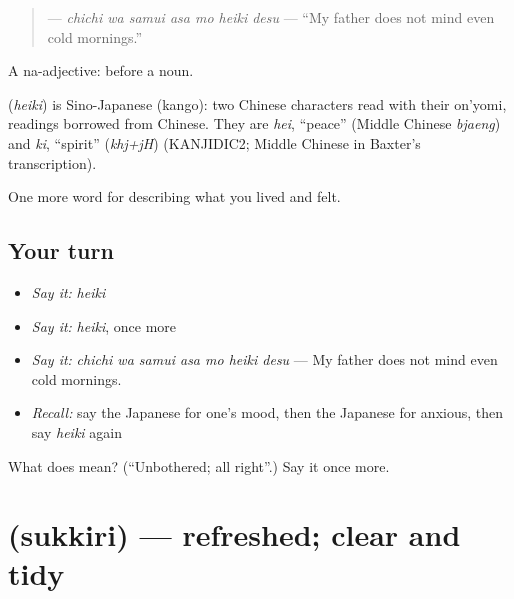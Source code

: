 \begin{quote}
\textbf{   } — \emph{chichi wa samui asa mo heiki desu} — \textquotedblleft{}My father does not mind even cold mornings.\textquotedblright{}
\end{quote}

A na-adjective:  before a noun.

\begin{cousinweb}
\textbf{} (\emph{heiki}) is Sino-Japanese (kango): two Chinese characters read with their on'yomi, readings borrowed from Chinese. They are \emph{hei}, \textquotedblleft{}peace\textquotedblright{} (Middle Chinese \emph{bjaeng}) and \emph{ki}, \textquotedblleft{}spirit\textquotedblright{} (\emph{khj+jH}) (KANJIDIC2; Middle Chinese in Baxter's transcription).
\end{cousinweb}

\begin{grammarlens}[title={What you've built}]
One more word for describing what you lived and felt.
\end{grammarlens}

\subsection*{Your turn}
\begin{itemize}
\raggedright
  \item \emph{Say it:} \emph{heiki}
  \item \emph{Say it:} \emph{heiki}, once more
  \item \emph{Say it:} \emph{chichi wa samui asa mo heiki desu} — My father does not mind even cold mornings.
  \item \emph{Recall:} say the Japanese for one's mood, then the Japanese for anxious, then say \emph{heiki} again
\end{itemize}

\begin{tcolorbox}[breakable,colback=teal!4,colframe=teal!35!black,title={Before you move on}]
What does  mean? (\textquotedblleft{}Unbothered; all right\textquotedblright{}.) Say it once more.
\end{tcolorbox}
\section[\texorpdfstring{\ja{すっきり} (sukkiri)}{すっきり (sukkiri)}]{ (sukkiri) — refreshed; clear and tidy}

